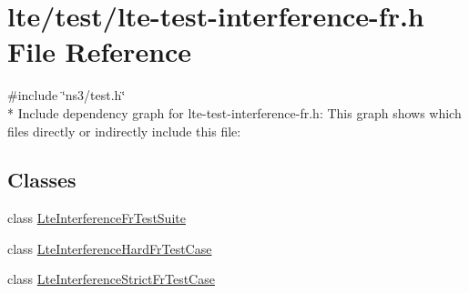 \hypertarget{lte-test-interference-fr_8h}{}\section{lte/test/lte-\/test-\/interference-\/fr.h File Reference}
\label{lte-test-interference-fr_8h}
{\ttfamily \#include \char`\"{}ns3/test.\+h\char`\"{}}\\*
Include dependency graph for lte-\/test-\/interference-\/fr.h\+:
This graph shows which files directly or indirectly include this file\+:
\subsection*{Classes}
\begin{DoxyCompactItemize}
\item 
class \hyperlink{classLteInterferenceFrTestSuite}{Lte\+Interference\+Fr\+Test\+Suite}
\item 
class \hyperlink{classLteInterferenceHardFrTestCase}{Lte\+Interference\+Hard\+Fr\+Test\+Case}
\item 
class \hyperlink{classLteInterferenceStrictFrTestCase}{Lte\+Interference\+Strict\+Fr\+Test\+Case}
\end{DoxyCompactItemize}
